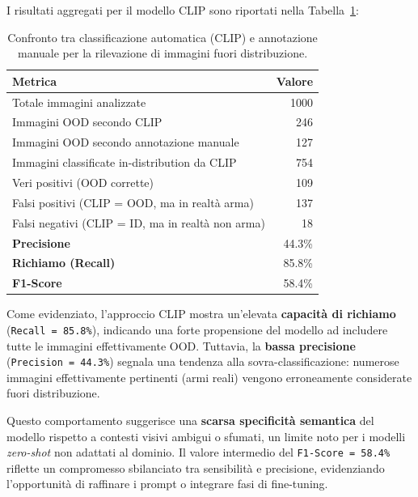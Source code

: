 \medskip

I risultati aggregati per il modello CLIP sono riportati nella Tabella~\ref{tab:ood-clip}:

\begin{table}[H]
\centering
\begin{tabular}{l r}
\toprule
\textbf{Metrica} & \textbf{Valore} \\
\midrule
Totale immagini analizzate & 1000 \\
Immagini OOD secondo CLIP & 246 \\
Immagini OOD secondo annotazione manuale & 127 \\
Immagini classificate in-distribution da CLIP & 754 \\
Veri positivi (OOD corrette) & 109 \\
Falsi positivi (CLIP = OOD, ma in realtà arma) & 137 \\
Falsi negativi (CLIP = ID, ma in realtà non arma) & 18 \\
\midrule
\textbf{Precisione} & 44.3\% \\
\textbf{Richiamo (Recall)} & 85.8\% \\
\textbf{F1-Score} & 58.4\% \\
\bottomrule
\end{tabular}
\caption{Confronto tra classificazione automatica (CLIP) e annotazione manuale per la rilevazione di immagini fuori distribuzione.}
\label{tab:ood-clip}
\end{table}

Come evidenziato, l’approccio CLIP mostra un’elevata \textbf{capacità di richiamo} (\texttt{Recall = 85.8\%}), indicando una forte propensione del modello ad includere tutte le immagini effettivamente OOD. Tuttavia, la \textbf{bassa precisione} (\texttt{Precision = 44.3\%}) segnala una tendenza alla sovra-classificazione: numerose immagini effettivamente pertinenti (armi reali) vengono erroneamente considerate fuori distribuzione.

\medskip

\noindent Questo comportamento suggerisce una \textbf{scarsa specificità semantica} del modello rispetto a contesti visivi ambigui o sfumati, un limite noto per i modelli \textit{zero-shot} non adattati al dominio. Il valore intermedio del \texttt{F1-Score = 58.4\%} riflette un compromesso sbilanciato tra sensibilità e precisione, evidenziando l’opportunità di raffinare i prompt o integrare fasi di fine-tuning.









